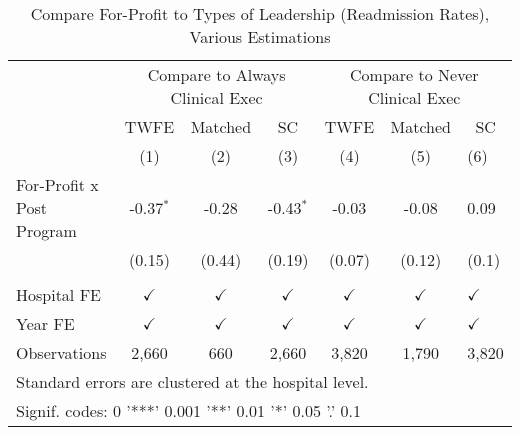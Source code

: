 \begin{table}[ht!]

\caption{\label{tab:forprofit_estimators}Compare For-Profit to Types of Leadership (Readmission Rates), Various Estimations}
\centering
\begin{tabular}[t]{lcccccl}
\toprule
\multicolumn{1}{c}{ } & \multicolumn{3}{c}{Compare to Always Clinical Exec} & \multicolumn{3}{c}{Compare to Never Clinical Exec} \\
\cmidrule(l{3pt}r{3pt}){2-4} \cmidrule(l{3pt}r{3pt}){5-7}
\multicolumn{1}{c}{ } & \multicolumn{1}{c}{TWFE} & \multicolumn{1}{c}{Matched} & \multicolumn{1}{c}{SC} & \multicolumn{1}{c}{TWFE} & \multicolumn{1}{c}{Matched} & \multicolumn{1}{c}{SC} \\
\cmidrule(l{3pt}r{3pt}){2-2} \cmidrule(l{3pt}r{3pt}){3-3} \cmidrule(l{3pt}r{3pt}){4-4} \cmidrule(l{3pt}r{3pt}){5-5} \cmidrule(l{3pt}r{3pt}){6-6} \cmidrule(l{3pt}r{3pt}){7-7}
 & (1) & (2) & (3) & (4) & (5) & (6)\\
\midrule
For-Profit x Post Program & -0.37$^{*}$ & -0.28 & -0.43$^{*}$ & -0.03 & -0.08 & 0.09\\
 & (0.15) & (0.44) & (0.19) & (0.07) & (0.12) & (0.1)\\
 &  &  &  &  &  & \\
Hospital FE & $\checkmark$ & $\checkmark$ & $\checkmark$ & $\checkmark$ & $\checkmark$ & $\checkmark$\\
Year FE & $\checkmark$ & $\checkmark$ & $\checkmark$ & $\checkmark$ & $\checkmark$ & $\checkmark$\\
\addlinespace
Observations & 2,660 & 660 & 2,660 & 3,820 & 1,790 & 3,820\\
\bottomrule
\multicolumn{7}{l}{\textsuperscript{} Standard errors are clustered at the hospital level.}\\
\multicolumn{7}{l}{\textsuperscript{} Signif. codes: 0 '***' 0.001 '**' 0.01 '*' 0.05 '.' 0.1}\\
\end{tabular}
\end{table}
